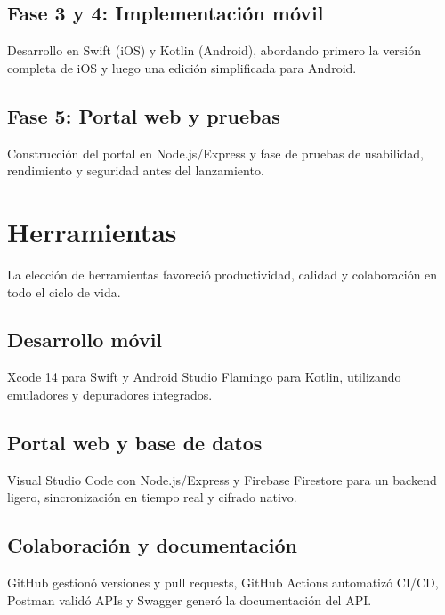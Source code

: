 \subsection{Fase 3 y 4: Implementación móvil}
\begin{large}
Desarrollo en Swift (iOS) y Kotlin (Android), abordando primero la versión completa de iOS y luego una edición simplificada para Android.
\end{large}

\subsection{Fase 5: Portal web y pruebas}
\begin{large}
Construcción del portal en Node.js/Express y fase de pruebas de usabilidad, rendimiento y seguridad antes del lanzamiento.
\end{large}

\section{Herramientas}
\begin{large}
La elección de herramientas favoreció productividad, calidad y colaboración en todo el ciclo de vida.  
\end{large}

\subsection{Desarrollo móvil}
\begin{large}
Xcode 14 para Swift y Android Studio Flamingo para Kotlin, utilizando emuladores y depuradores integrados.
\end{large}

\subsection{Portal web y base de datos}
\begin{large}
Visual Studio Code con Node.js/Express y Firebase Firestore para un backend ligero, sincronización en tiempo real y cifrado nativo.
\end{large}

\subsection{Colaboración y documentación}
\begin{large}
GitHub gestionó versiones y pull requests, GitHub Actions automatizó CI/CD, Postman validó APIs y Swagger generó la documentación del API.
\end{large}